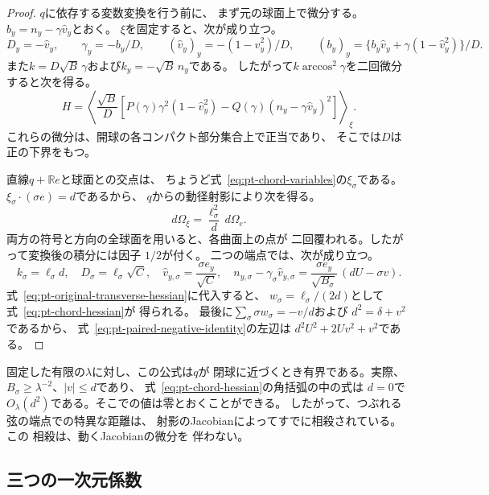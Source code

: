 \begin{proof}
$q$に依存する変数変換を行う前に、
まず元の球面上で微分する。
$b_y=n_y-\gamma\widehat v_y$とおく。
$\xi$を固定すると、次が成り立つ。
\[
 D_y=-\widehat v_y,\qquad
 \gamma_y=-b_y/D,\qquad
 (\widehat v_y)_y=-(1-\widehat v_y^2)/D,\qquad
 (b_y)_y=\{b_y\widehat v_y+
 \gamma(1-\widehat v_y^2)\}/D.
\]
また$k=D\sqrt B\,\gamma$および$k_y=-\sqrt B\,n_y$である。
したがって$k\arccos^2\gamma$を二回微分すると次を得る。
\begin{equation}
 H=\left\langle\frac{\sqrt B}{D}
 \left[
 P(\gamma)\gamma^2(1-\widehat v_y^2)
 -Q(\gamma)(n_y-\gamma\widehat v_y)^2
 \right]\right\rangle_\xi .
\label{eq:pt-original-transverse-hessian}
\end{equation}
これらの微分は、開球の各コンパクト部分集合上で正当であり、
そこでは$D$は正の下界をもつ。

直線$q+\mathbb R e$と球面との交点は、
ちょうど式~\eqref{eq:pt-chord-variables}の$\xi_\sigma$である。
$\xi_\sigma\cdot(\sigma e)=d$であるから、
$q$からの動径射影により次を得る。
\[
 d\Omega_\xi=\frac{\ell_\sigma^2}{d}\,d\Omega_e .
\]
両方の符号と方向の全球面を用いると、各曲面上の点が
二回覆われる。したがって変換後の積分には因子
$1/2$が付く。
二つの端点では、次が成り立つ。
\[
 k_\sigma=\ell_\sigma d,\quad
 D_\sigma=\ell_\sigma\sqrt C,\quad
 \widehat v_{y,\sigma}=\frac{\sigma e_y}{\sqrt C},\quad
 n_{y,\sigma}-\gamma_\sigma\widehat v_{y,\sigma}
 =\frac{\sigma e_y}{\sqrt{B_\sigma}}\,(dU-\sigma v).
\]
式~\eqref{eq:pt-original-transverse-hessian}に代入すると、
$w_\sigma=\ell_\sigma/(2d)$として式~\eqref{eq:pt-chord-hessian}が
得られる。
最後に$\sum_\sigma\sigma w_\sigma=-v/d$および
$d^2=\delta+v^2$であるから、
式~\eqref{eq:pt-paired-negative-identity}の左辺は
$d^2U^2+2Uv^2+v^2$である。
\end{proof}

固定した有限の$\lambda$に対し、この公式は$q$が
閉球に近づくとき有界である。実際、
$B_\sigma\geq\lambda^{-2}$、$|v|\leq d$であり、
式~\eqref{eq:pt-chord-hessian}の角括弧の中の式は
$d=0$で$O_\lambda(d^2)$である。そこでの値は零とおくことができる。
したがって、つぶれる弦の端点での特異な距離は、
射影のJacobianによってすでに相殺されている。この
相殺は、動くJacobianの微分を
伴わない。

\subsection{三つの一次元係数}
\label{subsec:pt-three-coefficients}

